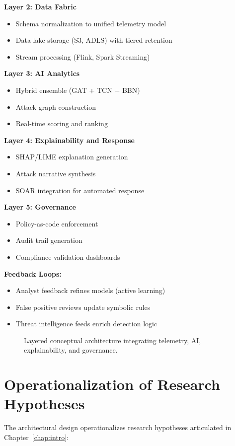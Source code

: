\textbf{Layer 2: Data Fabric}
\begin{itemize}
    \item Schema normalization to unified telemetry model
    \item Data lake storage (S3, ADLS) with tiered retention
    \item Stream processing (Flink, Spark Streaming)
\end{itemize}

\textbf{Layer 3: AI Analytics}
\begin{itemize}
    \item Hybrid ensemble (GAT + TCN + BBN)
    \item Attack graph construction
    \item Real-time scoring and ranking
\end{itemize}

\textbf{Layer 4: Explainability and Response}
\begin{itemize}
    \item SHAP/LIME explanation generation
    \item Attack narrative synthesis
    \item SOAR integration for automated response
\end{itemize}

\textbf{Layer 5: Governance}
\begin{itemize}
    \item Policy-as-code enforcement
    \item Audit trail generation
    \item Compliance validation dashboards
\end{itemize}

\textbf{Feedback Loops:}
\begin{itemize}
    \item Analyst feedback refines models (active learning)
    \item False positive reviews update symbolic rules
    \item Threat intelligence feeds enrich detection logic
\end{itemize}

\begin{figure}[H]
    \centering
    \caption{Layered conceptual architecture integrating telemetry, AI, explainability, and governance.}
    \label{fig:concept-arch}
\end{figure}

\section{Operationalization of Research Hypotheses}\label{sec:theory-hypotheses}
The architectural design operationalizes research hypotheses articulated in Chapter~\ref{chap:intro}:

